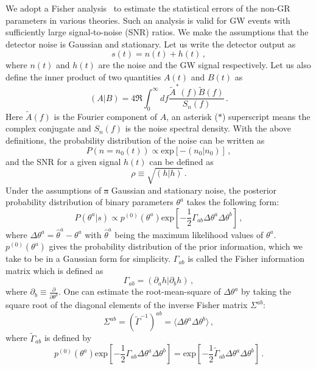\documentclass[prd,twocolumn,nofootinbib]{revtex4-1}
\newcommand\be{\begin{equation}}
\newcommand\ee{\end{equation}}
\begin{document}
We adopt a Fisher analysis~\cite{Cutler:1994ys} to estimate the statistical errors of the non-GR parameters in various theories. Such an analysis is valid for GW events with sufficiently large signal-to-noise (SNR) ratios. We make the assumptions that the detector noise is Gaussian and stationary. Let us write the detector output as
\be
s(t)=n(t)+h(t)\,,
\ee
where $n(t)$ and $h(t)$ are the noise and the GW signal respectively. Let us also define the inner product of two quantities $A(t)$ and $B(t)$ as
 \be
 \left(A|B\right)=4\Re\int_0^\infty df \frac{\tilde{A}^*(f)\tilde{B}(f)}{S_n \left( f \right)}\,.
 \ee
Here $\tilde{A}(f)$ is the Fourier component of $A$, an asterisk ($*$) superscript means the complex conjugate and $S_n\left(f\right)$ is the noise spectral density. With the above definitions, the probability distribution of the noise can be written as
 \be
P\left(n=n_0(t)\right) \propto \text{exp}\left[-\left(n_0|n_0\right)\right]\,,
\ee
and the SNR for a given signal $h(t)$ can be defined as
\be
\rho \equiv\sqrt{\left(h|h\right)}\,.
\ee
Under the assumptions of \sout{a} Gaussian and stationary noise, the posterior probability distribution of binary parameters $\theta^a$ takes the following form:
\be
P\left(\theta^a|s\right) \propto p^{(0)}\left(\theta^a\right) \text{exp}\left[-\frac{1}{2} \Gamma_{ab} \Delta\theta^a\Delta \theta^b \right]\,,
\ee
where $\Delta \theta^a=\hat{\theta}^a-\theta^a$ with $\hat{\theta}^a$ being the maximum likelihood values of $\theta^a$. $p^{(0)}\left(\theta^a\right)$ gives the probability distribution of the prior information, which we take to be in a Gaussian form for simplicity. $\Gamma_{ab}$ is called the Fisher information matrix which is defined as
\be
\Gamma_{ab}=\left(\partial_a h|\partial_b h \right)\,,
\ee
where $\partial_b\equiv \frac{\partial}{\partial \theta^b}$. One can estimate the root-mean-square of $\Delta \theta^a$ by taking the square root of the diagonal elements of the inverse Fisher matrix $\Sigma^{ab}$: 
\be
\Sigma^{ab}=\left(\tilde{\Gamma}^{-1}\right)^{ab}=\langle\Delta\theta^a\Delta \theta^b\rangle\,,
\ee
where $\tilde{\Gamma}_{ab}$ is defined by
\be
p^{(0)}\left(\theta^a\right) \text{exp}\left[-\frac{1}{2} \Gamma_{ab} \Delta\theta^a\Delta \theta^b \right]=\text{exp}\left[-\frac{1}{2} \tilde{\Gamma}_{ab} \Delta\theta^a\Delta \theta^b \right]\,.
\ee
\end{document}
